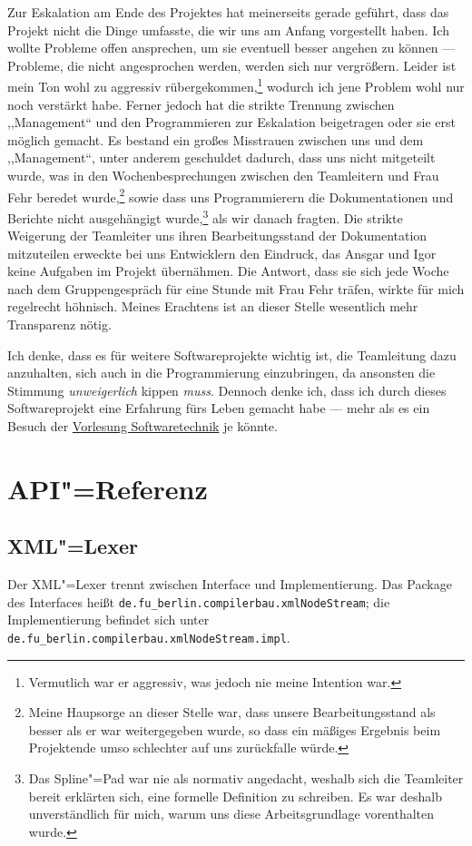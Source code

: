 \documentclass[10pt,a4paper,ngerman,titlepage,tocindentauto]{scrartcl}
\newcommand{\n}{\linebreak[1]}
\begin{document}
		Zur Eskalation am Ende des Projektes hat meinerseits gerade geführt, dass das Projekt nicht die Dinge umfasste,
		die wir uns am Anfang vorgestellt haben. Ich wollte Probleme offen ansprechen, um sie eventuell besser angehen zu
		können --- Probleme, die nicht angesprochen werden, werden sich nur vergrößern. Leider ist mein Ton wohl zu aggressiv
		rübergekommen,\footnote{Vermutlich war er aggressiv, was jedoch nie meine Intention war.}
		wodurch ich jene Problem wohl nur noch verstärkt habe. Ferner jedoch hat die strikte Trennung zwischen
		,,Management`` und den Programmieren zur Eskalation beigetragen oder sie erst möglich gemacht. Es bestand ein großes
		Misstrauen zwischen uns und dem ,,Management``, unter anderem geschuldet dadurch, dass uns nicht mitgeteilt wurde,
		was in den Wochenbesprechungen zwischen den Teamleitern und Frau Fehr beredet wurde,\footnote{Meine Haupsorge an dieser
		Stelle war, dass unsere Bearbeitungsstand als besser als er war weitergegeben wurde, so dass ein mäßiges Ergebnis
		beim Projektende umso schlechter auf uns zurückfalle würde.} sowie dass uns Programmierern
		die Dokumentationen und Berichte nicht ausgehängigt wurde,\footnote{Das Spline"=Pad war nie als normativ angedacht,
		weshalb sich die Teamleiter bereit erklärten sich, eine formelle Definition zu schreiben. Es war deshalb unverständlich
		für mich, warum uns diese Arbeitsgrundlage vorenthalten wurde.} als wir danach fragten. Die strikte Weigerung der Teamleiter
		uns ihren Bearbeitungsstand der Dokumentation mitzuteilen erweckte bei uns Entwicklern den Eindruck, das Ansgar und
		Igor keine Aufgaben im Projekt übernähmen. Die Antwort, dass sie sich jede Woche nach dem Gruppengespräch für eine
		Stunde mit Frau Fehr träfen, wirkte für mich regelrecht höhnisch. Meines Erachtens ist an dieser Stelle wesentlich
		mehr Transparenz nötig.
		
		Ich denke, dass es für weitere Softwareprojekte wichtig ist, die Teamleitung dazu anzuhalten, sich auch in die
		Programmierung einzubringen, da ansonsten die Stimmung {\em unweigerlich} kippen {\em muss}. Dennoch denke ich,
		dass ich durch dieses Softwareprojekt eine Erfahrung fürs Leben gemacht habe --- mehr als es ein Besuch der
		\href{https://www.inf.fu-berlin.de/w/SE/VorlesungSoftwaretechnik2008}{Vorlesung Softwaretechnik} je könnte.
		
	\section{API"=Referenz}
		\subsection[XML-Lexer]{\hypertarget{XML-Lexer-API}{XML"=Lexer}}
			Der XML"=Lexer trennt zwischen Interface und Implementierung.
			Das Package des Interfaces heißt \texttt{de.{\n}fu\_berlin.{\n}compilerbau.{\n}xml\-Node\-Stream};
			die Implementierung befindet sich unter \texttt{de.{\n}fu\_berlin.{\n}compilerbau.{\n}xml\-Node\-Stream.{\n}impl}.
			
\end{document}
